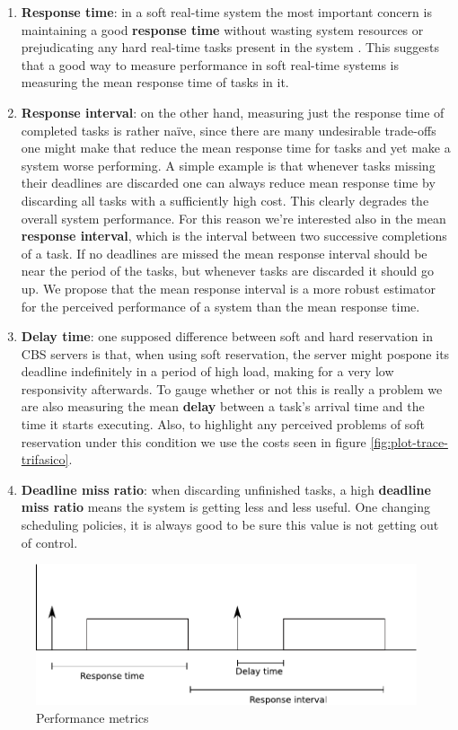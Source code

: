 \documentclass[times, 10pt,twocolumn]{article}
\begin{document}
\begin{enumerate}
\item \textbf{Response time}: in a soft real-time system the most
  important concern is maintaining a good \textbf{response time}
  without wasting system resources or prejudicating any hard real-time
  tasks present in the system \cite{buttazzo05:soft}. This suggests
  that a good way to measure performance in soft real-time systems is
  measuring the mean response time of tasks in it.
\item \textbf{Response interval}: on the other hand, measuring just
  the response time of completed tasks is rather naïve, since there
  are many undesirable trade-offs one might make that reduce the mean
  response time for tasks and yet make a system worse performing. A
  simple example is that whenever tasks missing their deadlines are
  discarded one can always reduce mean response time by discarding all
  tasks with a sufficiently high cost. This clearly degrades the
  overall system performance. For this reason we're interested also in
  the mean \textbf{response interval}, which is the interval between
  two successive completions of a task. If no deadlines are missed the
  mean response interval should be near the period of the tasks, but
  whenever tasks are discarded it should go up. We propose that the
  mean response interval is a more robust estimator for the perceived
  performance of a system than the mean response time.
\item \textbf{Delay time}: one supposed difference between soft and
  hard reservation in CBS servers is that, when using soft
  reservation, the server might pospone its deadline indefinitely in a
  period of high load, making for a very low responsivity
  afterwards. To gauge whether or not this is really a problem we are
  also measuring the mean \textbf{delay} between a task's arrival time
  and the time it starts executing. Also, to highlight any perceived
  problems of soft reservation under this condition we use the costs
  seen in figure \ref{fig:plot-trace-trifasico}.
\item \textbf{Deadline miss ratio}: when discarding unfinished tasks,
  a high \textbf{deadline miss ratio} means the system is getting less
  and less useful. One changing scheduling policies, it is always good
  to be sure this value is not getting out of control.
\end{enumerate}

\begin{figure}[t]
  \centering
  \includegraphics[scale=0.5]{metricas}
  \caption{Performance metrics}
  \label{fig:metrics}
\end{figure}
\end{document}
